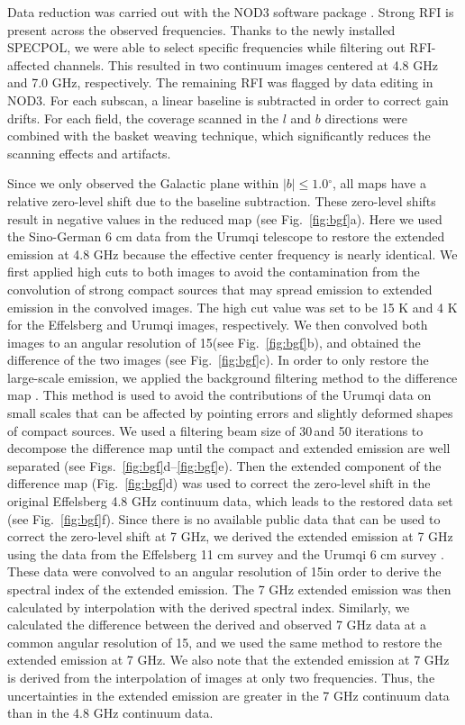 \documentclass{aa}
\newcommand{\degree}{$^\circ$}
\begin{document}
Data reduction was carried out with the NOD3 software package \citep{MuellerKrauseBeck2017}. Strong RFI is present across the observed frequencies. Thanks to the newly installed SPECPOL, we were able to select specific frequencies while filtering out RFI-affected channels. This resulted in two continuum images  centered at 4.8 GHz and 7.0 GHz, respectively. The remaining RFI was  flagged by data editing in NOD3. For each subscan, a linear baseline is subtracted in order to correct gain drifts. For each field, the coverage scanned in the $l$ and $b$ directions were combined with the basket weaving technique, which significantly reduces the scanning effects and artifacts.

Since we only observed the Galactic plane within $|b|\leq1.0$\degree, all maps have a relative zero-level shift due to the baseline subtraction. These zero-level shifts result in negative values in the reduced map (see Fig.~\ref{fig:bgf}a). Here we used the Sino-German 6 cm data from the Urumqi telescope \citep{SunHanReich2007,SunReichHan2011} to restore the extended emission at 4.8 GHz because the effective center frequency is nearly identical. We first applied high cuts to both images to avoid the contamination from the convolution of strong compact sources that may spread emission to extended emission in the convolved images. The high cut value was set to be 15 K and 4 K for the Effelsberg and Urumqi images, respectively. We then convolved both images to an angular resolution of 15\arcmin (see Fig.~\ref{fig:bgf}b), and obtained the difference of the two images (see Fig.~\ref{fig:bgf}c). In order to only restore the large-scale emission, we applied the background filtering method to the difference map \citep{1979A&AS...38..251S}. This method is used to avoid the contributions of the Urumqi data on small scales that can be affected by pointing errors and slightly deformed shapes of compact sources. We used a filtering beam size of 30\arcmin\,and 50 iterations to decompose the difference map until the compact and extended emission are well separated (see Figs.~\ref{fig:bgf}d--\ref{fig:bgf}e). Then the extended component of the difference map (Fig.~\ref{fig:bgf}d) was used to correct the zero-level shift in the original Effelsberg 4.8 GHz continuum data, which leads to the restored data set (see Fig.~\ref{fig:bgf}f). Since there is no available public data that can be used to correct the zero-level shift at 7 GHz, we derived the extended emission at 7 GHz using the data from the Effelsberg 11 cm survey \citep{ReichFuerst:1990aa} and the Urumqi 6 cm survey \citep{SunHanReich2007,SunReichHan2011}. These data were convolved to an angular resolution of 15\arcmin in order to derive the spectral index of the extended emission. The 7 GHz extended emission was then calculated by interpolation with the derived spectral index. Similarly, we calculated the difference between the derived and observed 7 GHz data at a common angular resolution of 15\arcmin, and we used the same method to restore the extended emission at 7 GHz. We also note that the extended emission at 7 GHz is derived from the interpolation of images at only two frequencies. Thus, the uncertainties in the extended emission are greater in the 7 GHz continuum data than in the 4.8 GHz continuum data.
\end{document}
